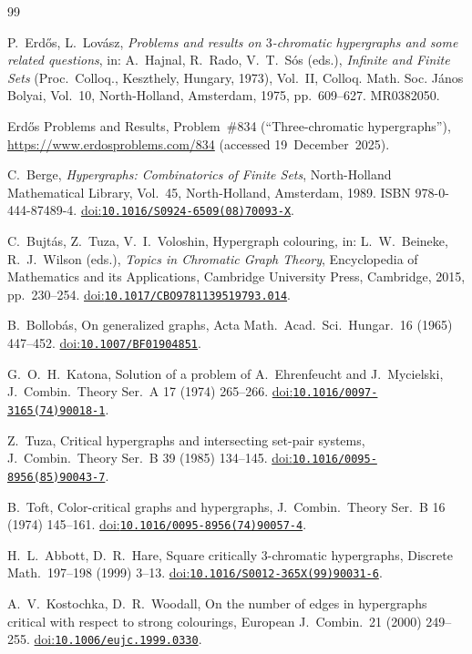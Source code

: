 \documentclass[11pt]{amsart}
\theoremstyle{definition}
\theoremstyle{remark}
\newcommand{\doi}[1]{\href{https://doi.org/#1}{doi:\nolinkurl{#1}}}
\begin{document}
\begin{thebibliography}{99}

P.~Erd\H{o}s, L.~Lov\'asz,
\emph{Problems and results on $3$-chromatic hypergraphs and some related questions},
in: A.~Hajnal, R.~Rado, V.~T.~S\'os (eds.),
\emph{Infinite and Finite Sets} (Proc.\ Colloq., Keszthely, Hungary, 1973), Vol.~II,
Colloq. Math. Soc. J\'anos Bolyai, Vol.~10,
North-Holland, Amsterdam, 1975, pp.~609--627.
MR0382050.

Erd\H{o}s Problems and Results,
Problem~\#834 (``Three-chromatic hypergraphs''),
\url{https://www.erdosproblems.com/834} (accessed 19~December~2025).

C.~Berge,
\emph{Hypergraphs: Combinatorics of Finite Sets},
North-Holland Mathematical Library, Vol.~45,
North-Holland, Amsterdam, 1989.
ISBN 978-0-444-87489-4.
\doi{10.1016/S0924-6509(08)70093-X}.

C.~Bujt\'as, Z.~Tuza, V.~I.~Voloshin,
Hypergraph colouring,
in: L.~W.~Beineke, R.~J.~Wilson (eds.),
\emph{Topics in Chromatic Graph Theory},
Encyclopedia of Mathematics and its Applications,
Cambridge University Press, Cambridge, 2015, pp.~230--254.
\doi{10.1017/CBO9781139519793.014}.

B.~Bollob\'as,
On generalized graphs,
Acta Math.\ Acad.\ Sci.\ Hungar.\ 16 (1965) 447--452.
\doi{10.1007/BF01904851}.

G.~O.~H.~Katona,
Solution of a problem of A.~Ehrenfeucht and J.~Mycielski,
J.\ Combin.\ Theory Ser.\ A 17 (1974) 265--266.
\doi{10.1016/0097-3165(74)90018-1}.

Z.~Tuza,
Critical hypergraphs and intersecting set-pair systems,
J.\ Combin.\ Theory Ser.\ B 39 (1985) 134--145.
\doi{10.1016/0095-8956(85)90043-7}.

B.~Toft,
Color-critical graphs and hypergraphs,
J.\ Combin.\ Theory Ser.\ B 16 (1974) 145--161.
\doi{10.1016/0095-8956(74)90057-4}.

H.~L.~Abbott, D.~R.~Hare,
Square critically $3$-chromatic hypergraphs,
Discrete Math.\ 197--198 (1999) 3--13.
\doi{10.1016/S0012-365X(99)90031-6}.

A.~V.~Kostochka, D.~R.~Woodall,
On the number of edges in hypergraphs critical with respect to strong colourings,
European J.\ Combin.\ 21 (2000) 249--255.
\doi{10.1006/eujc.1999.0330}.


\end{thebibliography}
\end{document}
